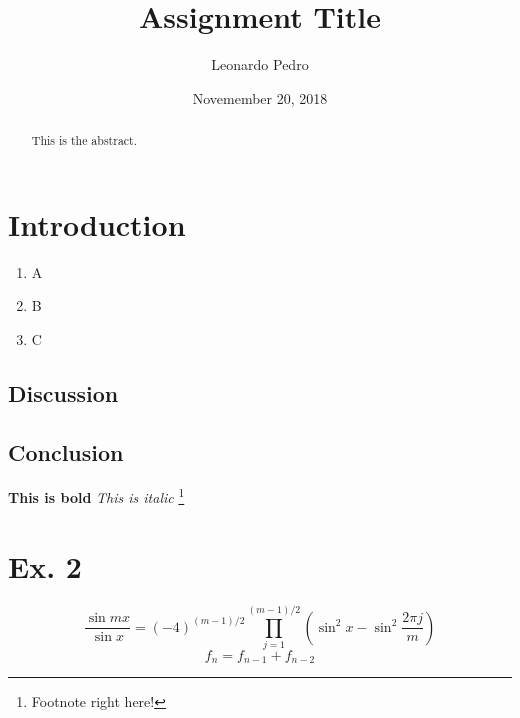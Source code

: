 \documentclass{article}
\begin{document}
\title {Assignment Title}
\author {Leonardo Pedro}
\date{Novemember 20, 2018}
\maketitle
\clearpage
\begin{abstract}
This is the abstract.
\end{abstract}
\section {Introduction}
\begin{enumerate}
\item A
\item B
\item C
\end{enumerate}
\subsection {Discussion}
\subsection {Conclusion}
\tableofcontents
\textbf{This is bold}
\textit{This is italic}
\footnote{Footnote right here!}
\section{Ex. 2}
\[
\frac{\sin mx}{\sin x} =(-4)^{(m-1)/2}\prod^{(m-1)/2}_{j=1}\left(\sin^2 x-\sin^2{\frac{2\pi j}{m}}\right)
\]
\begin{equation}
f_{n} = f_{n-1}+f_{n-2}
\end{equation}
\break
\break
\end{document}
